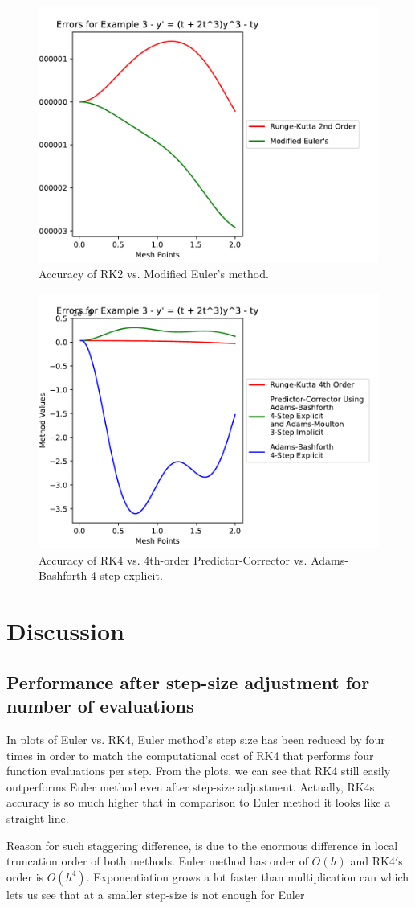 \documentclass[11pt]{article}	%
\begin{document}
\begin{figure}[H]
\centering
\includegraphics[width=.45\textwidth]{rk2_meuler_3}
\caption{Accuracy of RK2 vs. Modified Euler's method.}
\label{fig:rk2_meuler_3}
\end{figure}

\begin{figure}[H]
\centering
\includegraphics[width=.45\textwidth]{rk4_predictor_ab4_3}
\caption{Accuracy of RK4 vs. 4th-order Predictor-Corrector vs. Adams-Bashforth 4-step explicit.}
\label{fig:rk4_predictor_ab4_3}
\end{figure}
\clearpage
\section{Discussion}

\subsection{Performance after step-size adjustment for number of evaluations}
In plots of Euler vs. RK4, Euler method's step size has been reduced by four times in order to match the computational cost of RK4 that performs four function evaluations per step. From the plots, we can see that RK4 still
easily outperforms Euler method even after step-size adjustment. Actually, 
RK4s accuracy is so much higher that in comparison to Euler method it looks
like a straight line. 

Reason for such staggering difference, is due to the enormous difference in 
local truncation order of both methods. Euler method has order of $O(h)$ and RK4$\prime$s order is $O(h^4)$. Exponentiation grows a lot faster than multiplication can which lets us see that at a smaller step-size is not enough for Euler
\end{document}
